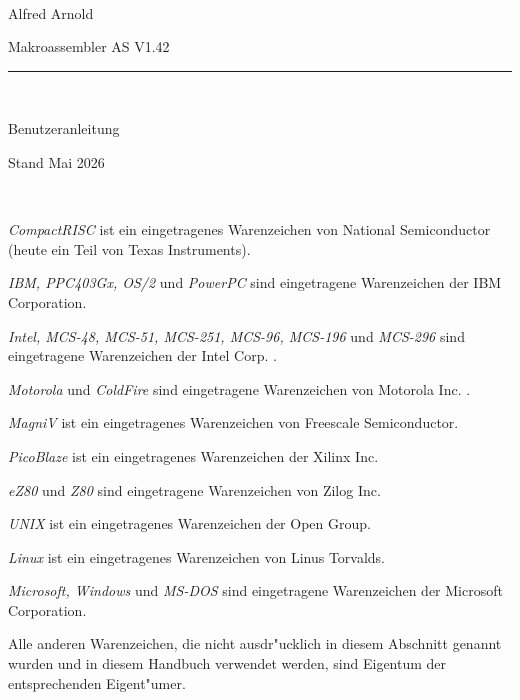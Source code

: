 \documentclass[12pt,a4paper,twoside]{report}
\newcommand{\asname}{AS}
\begin{document}
\thispagestyle{empty}

\
\vspace{7cm}\par

\begin{raggedright}
{\large Alfred Arnold}\\
\vspace{1cm}\par
{\huge Makroassembler \asname{} V1.42}\\
\rule{14cm}{0.3mm}\\
\vspace{2mm}\par
{\huge Benutzeranleitung}

\vspace{1cm}\par

{\large Stand Mai 2026}
\end{raggedright}

\clearpage
\thispagestyle{empty}

\ \vspace{4cm}

{\em CompactRISC} ist ein eingetragenes Warenzeichen von National
 Semiconductor (heute ein Teil von Texas Instruments).

{\em IBM, PPC403Gx, OS/2} und {\em PowerPC} sind eingetragene Warenzeichen
der IBM Corporation.

{\em Intel, MCS-48, MCS-51, MCS-251, MCS-96, MCS-196} und {\em MCS-296}
sind eingetragene Warenzeichen der Intel Corp. .

{\em Motorola} und {\em ColdFire} sind eingetragene Warenzeichen von
Motorola Inc. .

{\em MagniV} ist ein eingetragenes Warenzeichen von Freescale Semiconductor.

{\em PicoBlaze} ist ein eingetragenes Warenzeichen der Xilinx Inc.

{\em eZ80} und {\em Z80} sind eingetragene Warenzeichen von Zilog Inc.

{\em UNIX} ist ein eingetragenes Warenzeichen der Open Group.

{\em Linux} ist ein eingetragenes Warenzeichen von Linus Torvalds.

{\em Microsoft, Windows} und {\em MS-DOS} sind eingetragene Warenzeichen
der Microsoft Corporation.

Alle anderen Warenzeichen, die nicht ausdr"ucklich in diesem Abschnitt
genannt wurden und in diesem Handbuch verwendet werden, sind Eigentum
der entsprechenden Eigent"umer.
\end{document}
